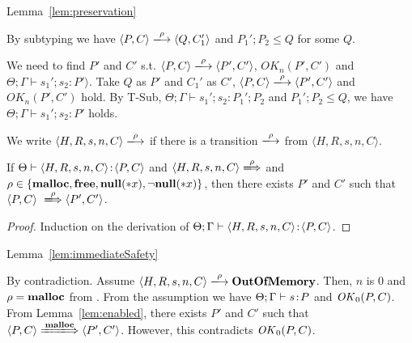 \begin{pfof}{Lemma~\ref{lem:preservation}}
\begin{itemize}
  By subtyping we have \( \langle P, C \rangle \xlongrightarrow{\rho}
  \langle Q, C_1' \rangle \) and \(P_1';P_2 \le Q\) for some \(Q\).

  We need to find \(P'\) and \(C'\) s.t. \( \langle P, C \rangle
  \xlongrightarrow{\rho} \langle P', C' \rangle \), \( OK_n(P', C')\)
  and \(\Theta; \Gamma \vdash s_1';s_2 : P' \rangle\).  Take \(Q\) as
  \(P'\) and \(C_1'\) as \(C'\), \( \langle P, C \rangle
  \xlongrightarrow{\rho} \langle P', C' \rangle \) and \( OK_n(P',
  C')\) hold. By T-Sub, \(\Theta; \Gamma \vdash s_1';s_2 : P_1';P_2\)
  and \(P_1';P_2 \le Q\), we have \(\Theta; \Gamma \vdash s_1';s_2 :
  P'\) holds.

\end{itemize}
\end{pfof}  


We write \(\langle H, R, s, n, C \rangle \xlongrightarrow{\rho}\) if
there is a transition \(\xlongrightarrow{\rho}\) from \(\langle H, R,
s, n, C \rangle\).

\begin{lemma}
\label{lem:enabled}
If \(\Theta \vdash \langle H, R, s, n, C \rangle \!:\! \langle
P,C \rangle\) and \(\langle H, R, s, n, C \rangle
\xLongrightarrow{\rho}\) and \(\rho \in \{\mathbf{malloc}, \mathbf{free}, {\bf null}(*x), \neg{\bf null}(*x)\}\), then
there exists \(P'\) and \(C'\) such that \( \langle P, C \rangle
\ \xLongrightarrow{\rho} \langle P', C'\rangle\).
\end{lemma}

\begin{proof}
Induction on the derivation of \(\Theta; \Gamma \vdash \langle H, R, s, n, C \rangle \!:\! \langle P, C \rangle\).
\end{proof}

\begin{pfof}{Lemma~\ref{lem:immediateSafety}}

By contradiction.  Assume \(\langle H, R, s, n, C \rangle
\xlongrightarrow{\rho} \OVERFLOW\). Then, \(n\) is \(0\) and \(\rho =
\mathbf{malloc} \) from .  From the assumption we have
\(\Theta;\Gamma \vdash s \!:\! P\) and \(\mathit{OK}_0(P, C)\).  From
Lemma~\ref{lem:enabled}, there exists \(P'\) and \(C'\) such that \(
\langle P, C \rangle \xLongrightarrow{\Malloc} \langle P', C'
\rangle\).  However, this contradicts \(\mathit{OK}_0(P, C)\).

\end{pfof}

